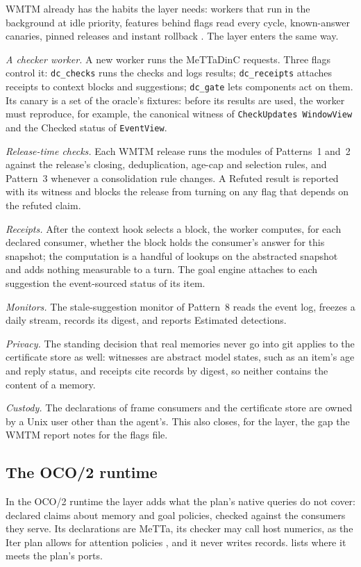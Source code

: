 \documentclass[11pt]{article}
\newcommand{\code}[1]{\texttt{#1}}
\theoremstyle{definition}
\theoremstyle{plain}
\begin{document}
WMTM already has the habits the layer needs: workers that run in the background at idle priority,
features behind flags read every cycle, known-answer canaries, pinned releases and instant rollback
\cite{wmtm}. The layer enters the same way.

\emph{A checker worker.} A new worker runs the MeTTaDinC requests. Three flags control it:
\code{dc\_checks} runs the checks and logs results; \code{dc\_receipts} attaches receipts to context
blocks and suggestions; \code{dc\_gate} lets components act on them. Its canary is a set of the
oracle's fixtures: before its results are used, the worker must reproduce, for example, the
canonical witness of \code{CheckUpdates WindowView} and the Checked status of \code{EventView}.

\emph{Release-time checks.} Each WMTM release runs the modules of Patterns~1 and~2 against the
release's closing, deduplication, age-cap and selection rules, and Pattern~3 whenever a
consolidation rule changes. A Refuted result is reported with its witness and blocks the release
from turning on any flag that depends on the refuted claim.

\emph{Receipts.} After the context hook selects a block, the worker computes, for each declared
consumer, whether the block holds the consumer's answer for this snapshot; the computation is a
handful of lookups on the abstracted snapshot and adds nothing measurable to a turn. The goal engine
attaches to each suggestion the event-sourced status of its item.

\emph{Monitors.} The stale-suggestion monitor of Pattern~8 reads the event log, freezes a daily
stream, records its digest, and reports Estimated detections.

\emph{Privacy.} The standing decision that real memories never go into git applies to the
certificate store as well: witnesses are abstract model states, such as an item's age and reply
status, and receipts cite records by digest, so neither contains the content of a memory.

\emph{Custody.} The declarations of frame consumers and the certificate store are owned by a Unix
user other than the agent's. This also closes, for the layer, the gap the WMTM report notes for the
flags file.

\subsection{The OCO/2 runtime}\label{sec:ocoint}

In the OCO/2 runtime the layer adds what the plan's native queries do not cover: declared claims
about memory and goal policies, checked against the consumers they serve. Its declarations are MeTTa, its checker may call host numerics, as the
Iter plan allows for attention policies \cite{itermem}, and it never writes records.
 lists where it meets the plan's ports.
\end{document}
